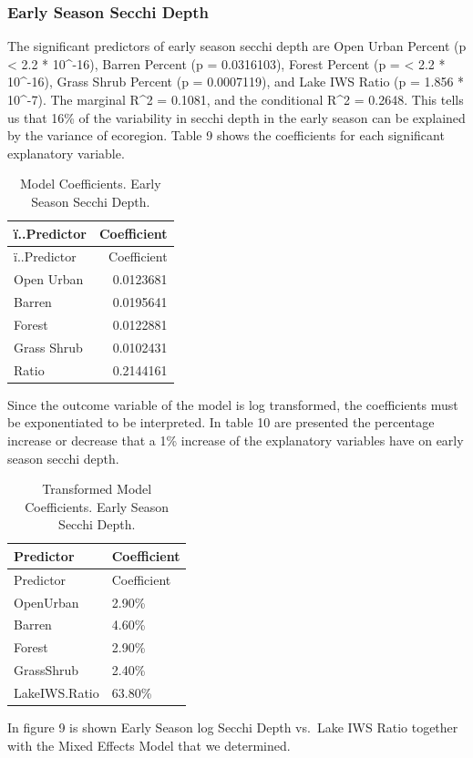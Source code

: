 \documentclass[12pt,]{article}
\begin{document}
\hypertarget{early-season-secchi-depth}{%
\subsubsection{Early Season Secchi
Depth}\label{early-season-secchi-depth}}

The significant predictors of early season secchi depth are Open Urban
Percent (p \textless{} 2.2 * 10\^{}-16), Barren Percent (p = 0.0316103),
Forest Percent (p = \textless{} 2.2 * 10\^{}-16), Grass Shrub Percent (p
= 0.0007119), and Lake IWS Ratio (p = 1.856 * 10\^{}-7). The marginal
R\^{}2 = 0.1081, and the conditional R\^{}2 = 0.2648. This tells us that
16\% of the variability in secchi depth in the early season can be
explained by the variance of ecoregion. Table 9 shows the coefficients
for each significant explanatory variable.

\begin{longtable}[]{@{}lr@{}}
\caption{Model Coefficients. Early Season Secchi Depth.}\tabularnewline
\toprule
ï..Predictor & Coefficient\tabularnewline
\midrule
\endfirsthead
\toprule
ï..Predictor & Coefficient\tabularnewline
\midrule
\endhead
Open Urban & 0.0123681\tabularnewline
Barren & 0.0195641\tabularnewline
Forest & 0.0122881\tabularnewline
Grass Shrub & 0.0102431\tabularnewline
Ratio & 0.2144161\tabularnewline
\bottomrule
\end{longtable}

Since the outcome variable of the model is log transformed, the
coefficients must be exponentiated to be interpreted. In table 10 are
presented the percentage increase or decrease that a 1\% increase of the
explanatory variables have on early season secchi depth.

\begin{longtable}[]{@{}ll@{}}
\caption{Transformed Model Coefficients. Early Season Secchi
Depth.}\tabularnewline
\toprule
Predictor & Coefficient\tabularnewline
\midrule
\endfirsthead
\toprule
Predictor & Coefficient\tabularnewline
\midrule
\endhead
OpenUrban & 2.90\%\tabularnewline
Barren & 4.60\%\tabularnewline
Forest & 2.90\%\tabularnewline
GrassShrub & 2.40\%\tabularnewline
LakeIWS.Ratio & 63.80\%\tabularnewline
\bottomrule
\end{longtable}

In figure 9 is shown Early Season log Secchi Depth vs.~Lake IWS Ratio
together with the Mixed Effects Model that we determined.
\end{document}
